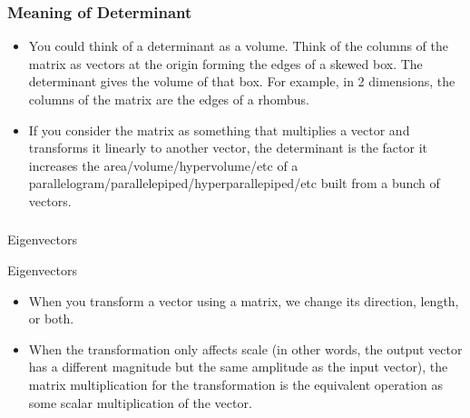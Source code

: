  \begin{frame}[fragile] \frametitle{Meaning of Determinant}

\begin{itemize}

\item You could think of a determinant as a volume. Think of the columns of the matrix as vectors at the origin forming the edges of a skewed box. The determinant gives the volume of that box. For example, in 2 dimensions, the columns of the matrix are the edges of a rhombus.

\item If you consider the matrix as something that multiplies a vector and transforms it linearly to another vector, the determinant is the factor it increases the area/volume/hypervolume/etc of a parallelogram/parallelepiped/hyperparallepiped/etc built from a bunch of vectors.
 \end{itemize}

\end{frame}



  \begin{frame}[fragile]\frametitle{}
\begin{center}
{\Large Eigenvectors}
\end{center}
\end{frame}

  \begin{frame}[fragile]{Eigenvectors}
\begin{itemize}

\item When you transform a vector using a matrix, we change its direction, length, or both. 
\item When the transformation only affects scale (in other words, the output vector has a different magnitude but the same amplitude as the input vector), the matrix multiplication for the transformation is the equivalent operation as some scalar multiplication of the vector.
\end{itemize}

\end{frame}

